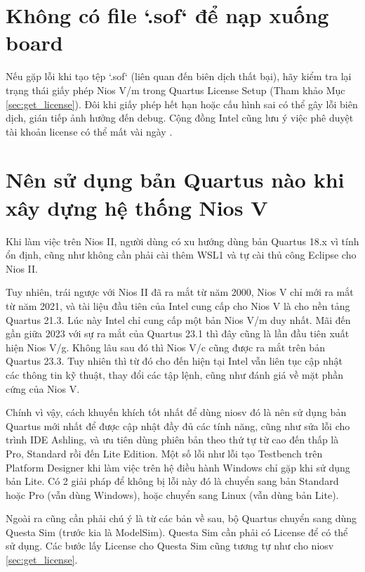 \section{Không có file `.sof` để nạp xuống board}
Nếu gặp lỗi khi tạo tệp `.sof` (liên quan đến biên dịch thất bại), hãy kiểm tra lại trạng thái giấy phép Nios V/m trong Quartus License Setup (Tham khảo Mục \ref{sec:get_license}). Đôi khi giấy phép hết hạn hoặc cấu hình sai có thể gây lỗi biên dịch, gián tiếp ảnh hưởng đến debug. Cộng đồng Intel cũng lưu ý việc phê duyệt tài khoản license có thể mất vài ngày \cite{intel-forum-license}.

\section{Nên sử dụng bản Quartus nào khi xây dựng hệ thống Nios V}
\label{sec:quartus_edition}

Khi làm việc trên Nios II, người dùng có xu hướng dùng bản Quartus 18.x vì tính ổn định, cũng như không cần phải cài thêm WSL1 và tự cài thủ công Eclipse cho Nios II.

Tuy nhiên, trái ngược với Nios II đã ra mắt từ năm 2000, Nios V chỉ mới ra mắt từ năm 2021, và tài liệu đầu tiên của Intel cung cấp cho Nios V là cho nền tảng Quartus 21.3. Lúc này Intel chỉ cung cấp một bản Nios V/m duy nhất. Mãi đến gần giữa 2023 với sự ra mắt của Quartus 23.1 thì đây cũng là lần đầu tiên xuất hiện Nios V/g. Không lâu sau đó thì Nios V/c cũng được ra mắt trên bản Quartus 23.3. Tuy nhiên thì từ đó cho đến hiện tại Intel vẫn liên tục cập nhật các thông tin kỹ thuật, thay đổi các tập lệnh, cũng như đánh giá về mặt phần cứng của Nios V. \cite{niosv-embedded-history}

Chính vì vậy, cách khuyến khích tốt nhất để dùng \acrshort{niosv} đó là nên sử dụng bản Quartus mới nhất để được cập nhật đầy đủ các tính năng, cũng như sửa lỗi cho trình IDE Ashling, và ưu tiên dùng phiên bản theo thứ tự từ cao đến thấp là Pro, Standard rồi đến Lite Edition. Một số lỗi như lỗi tạo Testbench trên Platform Designer khi làm việc trên hệ điều hành Windows chỉ gặp khi sử dụng bản Lite. Có 2 giải pháp để không bị lỗi này đó là chuyển sang bản Standard hoặc Pro (vẫn dùng Windows), hoặc chuyển sang Linux (vẫn dùng bản Lite).

Ngoài ra cũng cần phải chú ý là từ các bản về sau, bộ Quartus chuyển sang dùng Questa Sim (trước kia là ModelSim). Questa Sim cần phải có License để có thể sử dụng. Các bước lấy License cho Questa Sim cũng tương tự như cho \acrshort{niosv} \ref{sec:get_license}.

